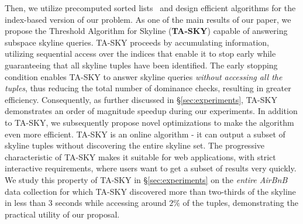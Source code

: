 Then, we utilize precomputed sorted lists~\cite{fagin2003optimal} and design efficient algorithms for the index-based version of our problem. 
As one of the main results of our paper, we propose the Threshold Algorithm for Skyline ({\bf TA-SKY}) capable of answering subspace skyline queries. 
TA-SKY proceeds by accumulating information, utilizing sequential access over the indices that enable it to stop early while guaranteeing that all skyline tuples have been identified. The early stopping condition enables TA-SKY to answer skyline queries {\em without accessing all the tuples}, thus reducing the total number of dominance checks, resulting in greater efficiency.
Consequently, as further discussed in \S\ref{sec:experiments}, TA-SKY demonstrates an order of magnitude speedup during our experiments.
In addition to TA-SKY, we subsequently propose novel optimizations to make the algorithm even more efficient. TA-SKY is an online algorithm - it can output a subset of skyline tuples without discovering the entire skyline set. The progressive characteristic of TA-SKY makes it suitable for web applications, with strict interactive requirements, where users want to get a subset of results very quickly.
We study this property of TA-SKY in \S\ref{sec:experiments} on the {\em entire AirBnB} data collection for which TA-SKY discovered more than two-thirds of the skyline in less than $3$ seconds while accessing around $2\%$ of the tuples, demonstrating the practical utility of our proposal.



